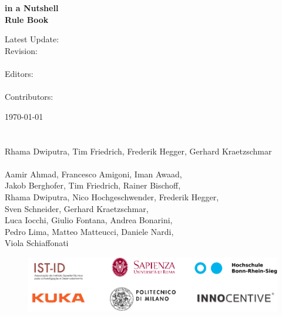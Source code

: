 \noindent\textbf{%
	{\large {} \erlir in a Nutshell}\\[1ex]
	{\large {} \erlir Rule Book}\\[1ex]
}

\vfill
\noindent
\begin{minipage}[t]{0.18\textwidth}
\flushleft
	Latest Update:\\
	Revision:\\
	\mbox{~}\\
	Editors:\\ 
	\mbox{~}\\
	Contributors:\\
\end{minipage}%
\hspace*{3mm}
\begin{minipage}[t]{0.8\textwidth}
\flushleft
	\today\\
	\revisionNumber\\
	\mbox{~}\\
	Rhama Dwiputra, Tim Friedrich, Frederik Hegger, Gerhard Kraetzschmar\\
	\mbox{~}\\
	Aamir Ahmad, Francesco Amigoni, Iman Awaad,\\ 
	Jakob Berghofer, Tim Friedrich, Rainer Bischoff,\\
	Rhama Dwiputra, Nico Hochgeschwender, Frederik Hegger,\\
	Sven Schneider, Gerhard Kraetzschmar, \\
	Luca Iocchi, Giulio Fontana, Andrea Bonarini,\\
	Pedro Lima,	Matteo Matteucci, Daniele Nardi, \\
	Viola Schiaffonati
\end{minipage}
\hfill

\vfill
\vspace*{-10mm}
\begin{figure}[b]
	\centering
	\includegraphics[height=\institutionLogoHeight]{./fig/logos/consortiumLogo.pdf}
\end{figure}

